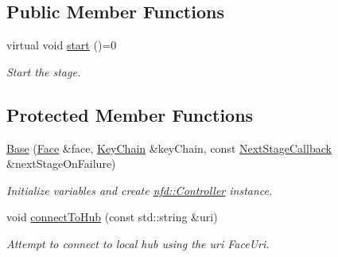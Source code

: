 \subsection*{Public Member Functions}
\begin{DoxyCompactItemize}
\item 
virtual void \hyperlink{classndn_1_1tools_1_1autoconfig_1_1Base_a0315cfdccf7c81140791e0a5a17cb9a7}{start} ()=0\hypertarget{classndn_1_1tools_1_1autoconfig_1_1Base_a0315cfdccf7c81140791e0a5a17cb9a7}{}\label{classndn_1_1tools_1_1autoconfig_1_1Base_a0315cfdccf7c81140791e0a5a17cb9a7}

\begin{DoxyCompactList}\small\item\em Start the stage. \end{DoxyCompactList}\end{DoxyCompactItemize}
\subsection*{Protected Member Functions}
\begin{DoxyCompactItemize}
\item 
\hyperlink{classndn_1_1tools_1_1autoconfig_1_1Base_a4d378253464c3fde9a499ccafb944153}{Base} (\hyperlink{classndn_1_1Face}{Face} \&face, \hyperlink{classndn_1_1security_1_1KeyChain}{Key\+Chain} \&key\+Chain, const \hyperlink{classndn_1_1tools_1_1autoconfig_1_1Base_a1b9466e64370f1ead34b754096562445}{Next\+Stage\+Callback} \&next\+Stage\+On\+Failure)
\begin{DoxyCompactList}\small\item\em Initialize variables and create \hyperlink{classndn_1_1nfd_1_1Controller}{nfd\+::\+Controller} instance. \end{DoxyCompactList}\item 
void \hyperlink{classndn_1_1tools_1_1autoconfig_1_1Base_a5c575db604e50a8d9ee358a5224de9ab}{connect\+To\+Hub} (const std\+::string \&uri)
\begin{DoxyCompactList}\small\item\em Attempt to connect to local hub using the {\ttfamily uri} Face\+Uri. \end{DoxyCompactList}\end{DoxyCompactItemize}
